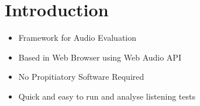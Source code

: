 \vspace{-0.8cm}
\section{Introduction}

\begin{itemize}%
	\item Framework for Audio Evaluation
	\item Based in Web Browser using Web Audio API
	\item No Propitiatory Software Required
	\item Quick and easy to run and analyse listening tests
\end{itemize}